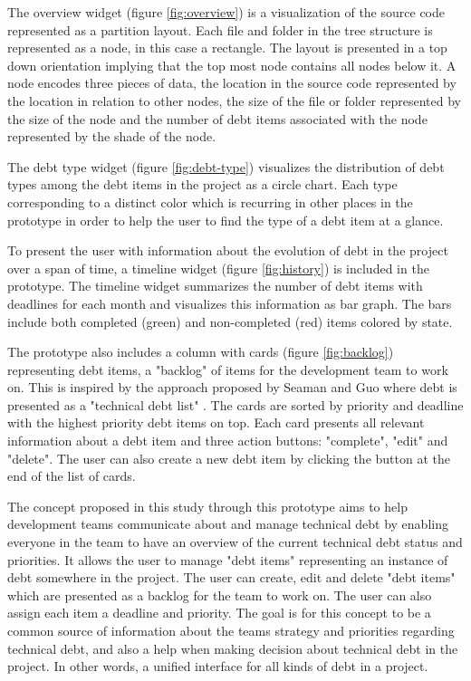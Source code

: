 

The overview widget (figure \ref{fig:overview}) is a visualization of the source code represented as a partition layout.
Each file and folder in the tree structure is represented as a node, in this case a rectangle.
The layout is presented in a top down orientation implying that the top most node contains all nodes below it.
A node encodes three pieces of data, the location in the source code represented by the location in relation to other nodes, the size of the file or folder represented by the size of the node and the number of debt items associated with the node represented by the shade of the node.



The debt type widget (figure \ref{fig:debt-type}) visualizes the distribution of debt types among the debt items in the project as a circle chart.
Each type corresponding to a distinct color which is recurring in other places in the prototype in order to help the user to find the type of a debt item at a glance.



To present the user with information about the evolution of debt in the project over a span of time, a timeline widget (figure \ref{fig:history}) is included in the prototype.
The timeline widget summarizes the number of debt items with deadlines for each month and visualizes this information as bar graph.
The bars include both completed (green) and non-completed (red) items colored by state.



The prototype also includes a column with cards (figure \ref{fig:backlog}) representing debt items, a "backlog" of items for the development team to work on. 
This is inspired by the approach proposed by Seaman and Guo where debt is presented as a "technical debt list" \cite{seaman_measuring_2011}.
The cards are sorted by priority and deadline with the highest priority debt items on top.
Each card presents all relevant information about a debt item and three action buttons: "complete", "edit" and "delete".
The user can also create a new debt item by clicking the button at the end of the list of cards.

The concept proposed in this study through this prototype aims to help development teams communicate about and manage technical debt by enabling everyone in the team to have an overview of the current technical debt status and priorities.
It allows the user to manage "debt items" representing an instance of debt somewhere in the project.
The user can create, edit and delete "debt items" which are presented as a backlog for the team to work on.
The user can also assign each item a deadline and priority. 
The goal is for this concept to be a common source of information about the teams strategy and priorities regarding technical debt, and also a help when making decision about technical debt in the project.
In other words, a unified interface for all kinds of debt in a project.